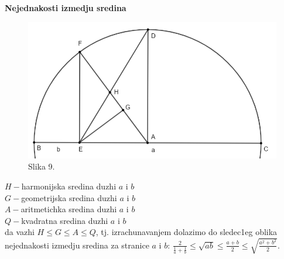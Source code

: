 \documentclass[11pt,letter]{report}
\newcommand{\D}{\displaystyle}
\begin{document}
\newpage
\begin{center}
\LARGE
    \textbf{Nejednakosti izmedju sredina}
\end{center}
\par
\begin{figure} 
\centering
\includegraphics[scale=0.5]{Slike/Slikica}
\caption*{Slika 9.}
\end{figure}
 
\begin{flushleft}
$H-$harmonijska sredina duzhi $a$ i $b$ \\
$G-$geometrijska sredina duzhi $a$ i $b$ \\
$A-$aritmetichka sredina duzhi $a$ i $b$ \\
$Q-$kvadratna sredina duzhi $a$ i $b$ \\
\vspace{0.5cm}
 da vazhi $H \leq G\leq A\leq Q$, tj. izrachunavanjem dolazimo do sledec1eg oblika nejednakosti izmedju sredina za stranice $a$ i $b$: $\D\frac{2}{\frac{1}{a}+\frac{1}{b}}\leq\sqrt{ab}\leq\frac{a+b}{2}\leq\sqrt{\frac{a^2+b^2}{2}}$.
\end{flushleft}
\end{document}
